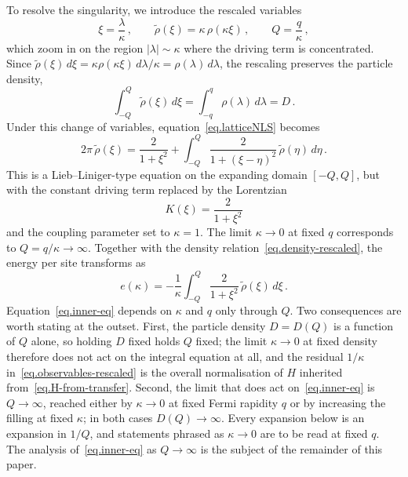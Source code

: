 \documentclass[11pt,a4paper]{article}
\newcommand{\kap}{\kappa}
\theoremstyle{definition}
\begin{document}
To resolve the singularity, we introduce the rescaled variables
\begin{equation}\label{eq.rescaling}
  \xi = \frac{\lambda}{\kappa}\,,\qquad
  \tilde\rho(\xi) = \kappa\,\rho(\kappa\xi)\,,\qquad
  Q = \frac{q}{\kappa}\,,
\end{equation}
which zoom in on the region $|\lambda| \sim \kappa$ where the
driving term is concentrated.  Since
$\tilde\rho(\xi)\,d\xi = \kappa\rho(\kappa\xi)\,d\lambda/\kappa = \rho(\lambda)\,d\lambda$,
the rescaling preserves the particle density,
\begin{equation}\label{eq.density-rescaled}
  \int_{-Q}^{Q}\tilde\rho(\xi)\,d\xi = \int_{-q}^{q}\rho(\lambda)\,d\lambda = D\,.
\end{equation}
Under this change of variables,
equation~\eqref{eq.latticeNLS} becomes
\begin{equation}\label{eq.inner-eq}
2\pi\,\tilde\rho(\xi) = \frac{2}{1 + \xi^2}
  + \int_{-Q}^{Q}\frac{2}{1 + (\xi - \eta)^2}\,
  \tilde\rho(\eta)\,d\eta\,.
\end{equation}
This is a Lieb--Liniger-type equation on the
expanding domain $[-Q,Q]$, but with the constant driving term
 replaced by the Lorentzian 
\begin{equation}\label{eq.rescaled_kernel}
    K(\xi) = \frac{2}{1+\xi^2}
\end{equation}
and the coupling
parameter set to $\kappa = 1$.  The limit $\kappa \to 0$ at fixed $q$
corresponds to $Q = q/\kappa \to \infty$.
Together with the density relation~\eqref{eq.density-rescaled}, the energy per
site transforms as
\begin{equation}\label{eq.observables-rescaled}
  e(\kap) = -\frac{1}{\kappa}\int_{-Q}^{Q}\frac{2}{1+\xi^2}\,
  \tilde\rho(\xi)\,d\xi\,.
\end{equation}
Equation~\eqref{eq.inner-eq} depends on $\kappa$ and $q$ only through $Q$.  Two
consequences are worth stating at the outset.
First, the particle density $D = D(Q)$ is a function of $Q$ alone, so holding
$D$ fixed holds $Q$ fixed; the limit $\kappa\to0$ at fixed density therefore
does not act on the integral equation at all, and the residual $1/\kappa$
in~\eqref{eq.observables-rescaled} is the overall normalisation of $H$ inherited
from~\eqref{eq.H-from-transfer}.
Second, the limit that does act on~\eqref{eq.inner-eq} is $Q\to\infty$, reached
either by $\kappa\to0$ at fixed Fermi rapidity $q$ or by increasing the filling
at fixed $\kappa$; in both cases $D(Q)\to\infty$.
Every expansion below is an expansion in $1/Q$, and statements phrased as
$\kappa\to0$ are to be read at fixed $q$.
The analysis of~\eqref{eq.inner-eq} as $Q \to \infty$ is the subject
of the remainder of this paper.
\end{document}
